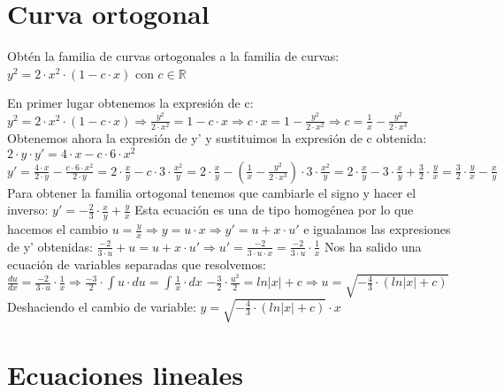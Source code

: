 
\section{Curva ortogonal}
\begin{ejer}
	Obtén la familia de curvas ortogonales a la familia de curvas:  
	$y^2 = 2\cdot x^2\cdot (1-c\cdot x)$ con $c\in \mathbb{R}$
\end{ejer}
\begin{sol}
	En primer lugar obtenemos la expresión de c:  
	$y^2 = 2\cdot x^2 \cdot (1-c\cdot x)\Rightarrow \frac{y^2}{2\cdot x^2} = 1-c\cdot x \Rightarrow c\cdot x = 1-\frac{y^2}{2\cdot x^2} \Rightarrow c = \frac{1}{x} - \frac{y^2}{2\cdot x^3}$  
	Obtenemos ahora la expresión de y' y sustituimos la expresión de c obtenida:  
	$2\cdot y\cdot y' = 4\cdot x - c\cdot 6\cdot x^2$  
	$y' = \frac{4\cdot x}{2\cdot y}-\frac{c\cdot 6\cdot x^2}{2\cdot y} = 2\cdot \frac{x}{y}-c\cdot 3\cdot \frac{x^2}{y} = 2\cdot \frac{x}{y}-(\frac{1}{x}-\frac{y^2}{2\cdot x^3})\cdot 3\cdot \frac{x^2}{y} = 2\cdot \frac{x}{y}-3\cdot \frac{x}{y} + \frac{3}{2}\cdot \frac{y}{x} = \frac{3}{2}\cdot \frac{y}{x} - \frac{x}{y}$  
	Para obtener la familia ortogonal tenemos que cambiarle el signo y hacer el inverso:  
	$y' = -\frac{2}{3}\cdot \frac{x}{y} + \frac{y}{x}$  
	Esta ecuación es una de tipo homogénea por lo que hacemos el cambio $u = \frac{y}{x} \Rightarrow y = u\cdot x\Rightarrow y' = u+x\cdot u'$  e igualamos las expresiones de y' obtenidas:  
	$\frac{-2}{3\cdot u} + u = u + x\cdot u'\Rightarrow u' = \frac{-2}{3\cdot u\cdot x} = \frac{-2}{3\cdot u}\cdot \frac{1}{x}$  
	Nos ha salido una ecuación de variables separadas que resolvemos:  
	$\frac{du}{dx} = \frac{-2}{3\cdot u}\cdot \frac{1}{x}\Rightarrow \frac{-3}{2}\cdot \int u\cdot du = \int \frac{1}{x}\cdot dx$  
	$-\frac{3}{2}\cdot \frac{u^2}{2} = ln|x| + c \Rightarrow u = \sqrt{-\frac{4}{3}\cdot(ln|x| + c)}$  
	Deshaciendo el cambio de variable:  
	$y = \sqrt{-\frac{4}{3}\cdot (ln|x| + c)}\cdot x$
\end{sol}


\section{Ecuaciones lineales}

